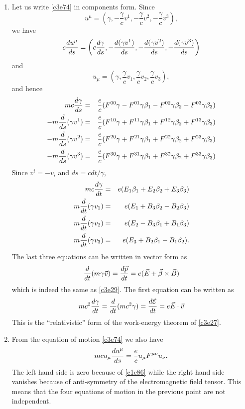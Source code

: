 \begin{enumerate}
\item Let us write \eqref{c3e74} in components form. Since
\[
u^\mu = \left(\gamma, -\frac{\gamma}{c}v^1, -\frac{\gamma}{c}v^2, -\frac{\gamma}{c}v^3\right),
\]
we have
\[
c\frac{d{u^\mu}}{d{s}} = \left(c\frac{d{\gamma}}{d{s}}, -\frac{d{(\gamma v^1)}}{d{s}}, 
-\frac{d{(\gamma v^2)}}{d{s}}, -\frac{d{(\gamma v^3)}}{d{s}}\right)
\]
and
\[
u_\mu = \left(\gamma, \frac{\gamma}{c}v_1, \frac{\gamma}{c}v_2, \frac{\gamma}{c}v_3\right),
\]
and hence
\begin{eqnarray*}
mc\frac{d{\gamma}}{d{s}} &=& \frac{e}{c}(F^{00}\gamma - F^{01}\gamma \beta_1 - F^{02}\gamma \beta_2 -F^{03}\gamma \beta_3) \\
-m\frac{d}{ds}(\gamma v^1)&=&\frac{e}{c}(F^{10}\gamma + F^{11}\gamma \beta_1 + F^{12}\gamma \beta_2 + F^{13}\gamma \beta_3) \\
-m\frac{d}{ds}(\gamma v^2)&=&\frac{e}{c}(F^{20}\gamma + F^{21}\gamma \beta_1 + F^{22}\gamma \beta_2 + F^{23}\gamma \beta_3) \\
-m\frac{d}{ds}(\gamma v^3)&=&\frac{e}{c}(F^{30}\gamma + F^{31}\gamma \beta_1 + F^{32}\gamma \beta_2 + F^{33}\gamma \beta_3) 
\end{eqnarray*}
Since $v^i = -v_i$ and $ds = cdt/\gamma$,
\begin{eqnarray*}
mc\frac{d{\gamma}}{d{t}} &=& e(E_1 \beta_1 + E_2 \beta_2 + E_3 \beta_3) \\
m\frac{d}{dt}(\gamma v_1) &=& e(E_1 + B_3 \beta_2 - B_2 \beta_3) \\
m\frac{d}{dt}(\gamma v_2) &=& e(E_2 - B_3 \beta_1 + B_1 \beta_3) \\
m\frac{d}{dt}(\gamma v_3) &=& e(E_3 + B_2 \beta_1 - B_1 \beta_2).
\end{eqnarray*}
The last three equations can be written in vector form as
\[
\frac{d}{dt}(m\gamma\vec{v}) = \frac{d{\vec{p}}}{d{t}} = e(\vec{E} + \vec{\beta} \times \vec{B})
\]
which is indeed the same as \eqref{c3e29}. The first equation can be written as
\[
mc^2\frac{d{\gamma}}{d{t}} = \frac{d}{dt}(mc^2\gamma) = \frac{d{\mathcal{E}}}{d{t}} = e\vec{E}\cdot\vec{v}
\]
This is the ``relativistic'' form of the work-energy theorem of \eqref{c3e27}.

\item From the equation of motion \eqref{c3e74} we also have
\[
mcu_\mu\frac{d{u^\mu}}{d{s}} = \frac{e}{c}u_\mu F^{\mu\nu}u_\nu.
\]
The left hand side is zero because of \eqref{c1e86} while the right hand side 
vanishes because of anti-symmetry of the electromagnetic field tensor. This means
that the four equations of motion in the previous point are not independent.


\end{enumerate}
